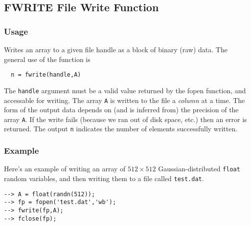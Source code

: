 %
%
%
\subsection{FWRITE File Write Function}
\subsubsection{Usage}
Writes an array to a given file handle as a block of binary (raw) data.
The general use of the function is
\begin{verbatim}
  n = fwrite(handle,A)
\end{verbatim}
The \verb|handle| argument must be a valid value returned by the fopen 
function, and accessable for writing. The array \verb|A| is written to
the file a \emph{column} at a time.  The form of the output data depends
on (and is inferred from) the precision of the array \verb|A|.  If the 
write fails (because we ran out of disk space, etc.) then an error
is returned.  The output \verb|n| indicates the number of elements
successfully written.
\subsubsection{Example}
Here's an example of writing an array of $512 \times 512$ Gaussian-distributed \verb|float| random variables, and then writing them to a file called \verb|test.dat|.
\begin{verbatim}
--> A = float(randn(512));
--> fp = fopen('test.dat','wb');
--> fwrite(fp,A);
--> fclose(fp);
\end{verbatim}
